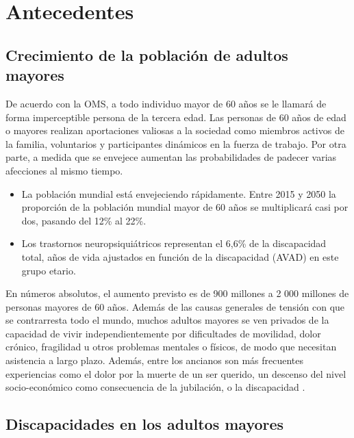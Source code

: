 \section{Antecedentes}
\subsection{Crecimiento de la población de adultos mayores}

De acuerdo con la OMS, a todo individuo mayor de 60 años se le llamará de forma imperceptible persona de la tercera edad. Las personas de 60 años de edad o mayores realizan aportaciones valiosas a la sociedad como miembros activos de la familia, voluntarios y participantes dinámicos en la fuerza de trabajo. Por otra parte, a medida que se envejece aumentan las probabilidades de padecer varias afecciones al mismo tiempo. \\

\begin{itemize}
	\item La población mundial está envejeciendo rápidamente. Entre 2015 y 2050 la proporción de la población mundial mayor de 60 años se multiplicará casi por dos, pasando del 12\% al 22\%.
	\item Los trastornos neuropsiquiátricos representan el 6,6\% de la discapacidad total, años de vida ajustados en función de la discapacidad (AVAD) en este grupo etario.
\end{itemize}

En números absolutos, el aumento previsto es de 900 millones a 2 000 millones de personas mayores de 60 años. Además de las causas generales de tensión con que se contrarresta todo el mundo, muchos adultos mayores se ven privados de la capacidad de vivir independientemente por dificultades de movilidad, dolor crónico, fragilidad u otros problemas mentales o físicos, de modo que necesitan asistencia a largo plazo. Además, entre los ancianos son más frecuentes experiencias como el dolor por la muerte de un ser querido, un descenso del nivel socio-económico como consecuencia de la jubilación, o la discapacidad \cite{cuatro}.

\subsection{Discapacidades en los adultos mayores}


